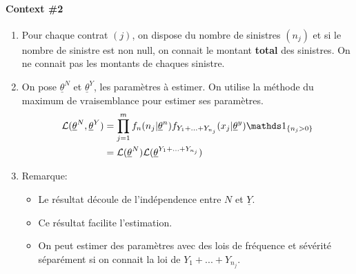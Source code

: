 \paragraph{Context \#2}
\begin{enumerate}[label=(\arabic*)]
    \item Pour chaque contrat $(j)$, on dispose du nombre de sinistres $(n_j)$ et si le nombre de sinistre est non null, on connait le montant \textbf{total} des sinistres. On ne connait pas les montants de chaques sinistre.
    \item On pose $\underline{\theta}^N$ et $\underline{\theta}^Y$, les paramètres à estimer. On utilise la méthode du maximum de vraisemblance pour estimer ses paramètres. 
        \begin{align*}
            \mathcal{L}(\underline{\theta}^N,\underline{\theta}^Y) &= \prod_{j=1}^m  f_n(n_j|\underline{\theta}^n)  f_{Y_1+...+Y_{n_j}}(x_j|\underline{\theta}^y) \indic{n_j>0} \\
            &= \mathcal{L}(\underline{\theta}^N)\mathcal{L}(\underline{\theta}^{Y_1+...+Y_{n_j}})
        \end{align*}
    \item Remarque:
    \begin{itemize}
        \item Le résultat découle de l'indépendence entre $N$ et $\underline{Y}$.
        \item Ce résultat facilite l'estimation.
        \item On peut estimer des paramètres avec des lois de fréquence et sévérité séparément si on connait la loi de $Y_1+...+Y_{n_j}$.
    \end{itemize}
\end{enumerate}

